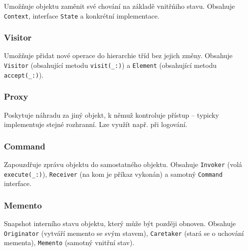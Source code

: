 Umožňuje objektu zaměnit své chování na základě vnitřńiho stavu.
Obsahuje \texttt{Context}, interface \texttt{State} a konkrétní implementace.

\subsubsection{Visitor}

Umožňuje přidat nové operace do hierarchie tříd bez jejich změny.
Obsahuje \texttt{Visitor} (obsahující metodu \texttt{visit(\_:)}) a \texttt{Element} (obsahující metodu \texttt{accept(\_:)}).

\subsubsection{Proxy}

Poskytuje náhradu za jiný objekt, k němuž kontroluje přístup -- typicky implementuje stejné rozhranní.
Lze využít např. při logování.

\subsubsection{Command}

Zapouzdřuje zprávu objektu do samostatného objektu.
Obsahuje \texttt{Invoker} (volá \texttt{execute(\_:)}), \texttt{Receiver} (na kom je příkaz vykonán) a samotný \texttt{Command} interface.

\subsubsection{Memento}

Snapshot interního stavu objektu, který může být později obnoven.
Obsahuje \texttt{Originator} (vytváří memento se svým stavem), \texttt{Caretaker} (stará se o uchování mementa), \texttt{Memento} (samotný vnitřní stav).
